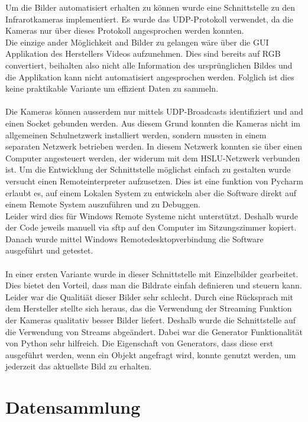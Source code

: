 Um die Bilder automatisiert erhalten zu können wurde eine Schnittstelle zu den Infrarotkameras implementiert. Es wurde das UDP-Protokoll verwendet, da die Kameras nur über dieses Protokoll angesprochen werden konnten.\\
 Die einzige ander Möglichkeit and Bilder zu gelangen wäre über die GUI Applikation des Herstellers Videos aufzunehmen. Dies sind bereits auf RGB convertiert, beihalten also nicht alle Information des ursprünglichen Bildes und die Applikation kann nicht automatisiert angesprochen werden. Folglich ist dies keine praktikable Variante um effizient Daten zu sammeln.\\
\\
Die Kameras können ausserdem nur mittels UDP-Broadcasts identifiziert und and einen Socket gebunden werden. Aus diesem Grund konnten die Kameras nicht im allgemeinen Schulnetzwerk installiert werden, sondern mussten in einem separaten Netzwerk betrieben werden. In diesem Netzwerk konnten sie über einen Computer angesteuert werden, der widerum mit dem HSLU-Netzwerk verbunden ist. Um die Entwicklung der Schnittstelle möglichst einfach zu gestalten wurde versucht einen Remoteinterpreter aufzusetzen. Dies ist eine funktion von Pycharm \parencite{pycharm} erlaubt es, auf einem Lokalen System zu entwickeln aber die Software direkt auf einem Remote System auszuführen und zu Debuggen.\\
Leider wird dies für Windows Remote Systeme nicht unterstützt. Deshalb wurde der Code jeweils manuell via sftp auf den Computer im Sitzungszimmer kopiert. Danach wurde mittel Windows Remotedesktopverbindung die Software ausgeführt und getestet. \\
\\
In einer ersten Variante wurde in dieser Schnittstelle mit Einzelbilder gearbeitet. Dies bietet den Vorteil, dass man die Bildrate einfah definieren und steuern kann. Leider war die Qualitiät dieser Bilder sehr schlecht. Durch eine Rücksprach mit dem Hersteller stellte sich heraus, das die Verwendung der Streaming Funktion der Kameras qualitativ besser Bilder liefert. Deshalb wurde die Schnittstelle auf die Verwendung von Streams abgeändert. Dabei war die Generator Funktionalität von Python sehr hilfreich. Die Eigenschaft von Generators, dass diese erst ausgeführt werden, wenn ein Objekt angefragt wird, konnte genutzt werden, um jederzeit das aktuellste Bild zu erhalten.

\section{Datensammlung}

